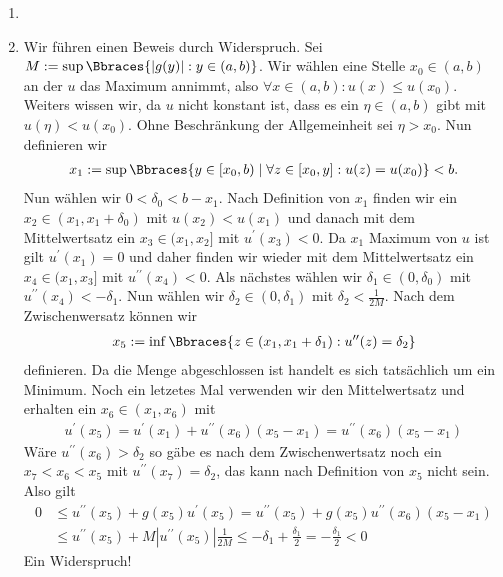 \begin{solution}
	
	\begin{enumerate}[label = (\roman*)]
		\item 
		\item Wir führen einen Beweis durch Widerspruch. Sei $M := \sup\Bbraces{|g(y)|: y \in (a,b)}$. Wir wählen eine Stelle $x_0 \in (a,b)$ an der $u$ das Maximum annimmt, also $\forall x \in (a,b): u(x) \leq u(x_0)$. Weiters wissen wir, da $u$ nicht konstant ist, dass es ein $\eta \in (a,b)$ gibt mit $u(\eta) < u(x_0)$. Ohne Beschränkung der Allgemeinheit sei $\eta > x_0$. Nun definieren wir
		\begin{align*}
		x_1 := \sup\Bbraces{y \in [x_0, b) \mid \forall z \in [x_0, y]: u(z) = u(x_0)} < b.
		\end{align*}
		Nun wählen wir $0 < \delta_0 < b - x_1$. Nach Definition von $x_1$ finden wir ein $x_2 \in (x_1,x_1 + \delta_0)$ mit $u(x_2) < u(x_1)$ und danach mit dem Mittelwertsatz ein $x_3 \in (x_1, x_2]$ mit $u^\prime(x_3) < 0$. Da $x_1$ Maximum von $u$ ist gilt $u^\prime(x_1) = 0$ und daher finden wir wieder mit dem Mittelwertsatz ein $x_4 \in (x_1, x_3]$ mit $u^{\prime\prime}(x_4) < 0$. Als nächstes wählen wir $\delta_1 \in (0, \delta_0)$ mit $u^{\prime\prime}(x_4) < - \delta_1$. Nun wählen wir $\delta_2 \in (0, \delta_1)$ mit $\delta_2 < \frac{1}{2M}$. Nach dem Zwischenwersatz können wir 
		\begin{align*}
		x_5 := \inf\Bbraces{z \in (x_1, x_1 + \delta_1): u^{\prime\prime}(z) = \delta_2}
		\end{align*}
		definieren. Da die Menge abgeschlossen ist handelt es sich tatsächlich um ein Minimum. Noch ein letzetes Mal verwenden wir den Mittelwertsatz und erhalten ein $x_6 \in (x_1, x_6)$ mit 
		\begin{align*}
		u^\prime(x_5) = u^\prime(x_1) + u^{\prime\prime}(x_6) (x_5 - x_1) = u^{\prime\prime}(x_6) (x_5 - x_1)
		\end{align*}
		Wäre $u^{\prime\prime}(x_6) > \delta_2$ so gäbe es nach dem Zwischenwertsatz noch ein $x_7 < x_6 < x_5$ mit $u^{\prime\prime}(x_7) = \delta_2$, das kann nach Definition von $x_5$ nicht sein. Also gilt
		\begin{align*}
		0 &\leq u^{\prime\prime}(x_5) + g(x_5) u^\prime (x_5) = u^{\prime\prime}(x_5) + g(x_5) u^{\prime\prime}(x_6)(x_5 - x_1) \\
		&\leq u^{\prime\prime}(x_5) + M |u^{\prime\prime}(x_5)| \frac{1}{2M} \leq -\delta_1 + \frac{\delta_1}{2} = -\frac{\delta_1}{2} < 0
		\end{align*}
		Ein Widerspruch!
	\end{enumerate}


\end{solution}


